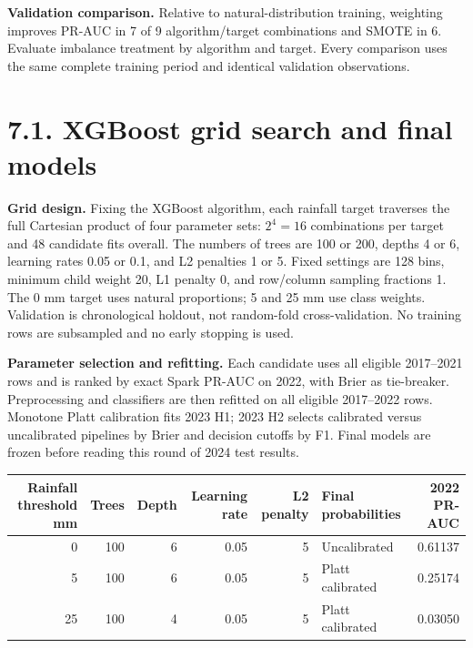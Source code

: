 \documentclass[UTF8,fontset=fandol,10pt,a4paper,landscape]{ctexart}
\begin{document}
\textbf{Validation comparison.} Relative to natural-distribution training, weighting improves PR-AUC in 7 of 9 algorithm/target combinations and SMOTE in 6. Evaluate imbalance treatment by algorithm and target. Every comparison uses the same complete training period and identical validation observations.

\clearpage\section*{7.1. XGBoost grid search and final models}

\textbf{Grid design.} Fixing the XGBoost algorithm, each rainfall target traverses the full Cartesian product of four parameter sets: $2^4=16$ combinations per target and 48 candidate fits overall. The numbers of trees are 100 or 200, depths 4 or 6, learning rates 0.05 or 0.1, and L2 penalties 1 or 5. Fixed settings are 128 bins, minimum child weight 20, L1 penalty 0, and row/column sampling fractions 1. The 0 mm target uses natural proportions; 5 and 25 mm use class weights. Validation is chronological holdout, not random-fold cross-validation. No training rows are subsampled and no early stopping is used.

\textbf{Parameter selection and refitting.} Each candidate uses all eligible 2017--2021 rows and is ranked by exact Spark PR-AUC on 2022, with Brier as tie-breaker. Preprocessing and classifiers are then refitted on all eligible 2017--2022 rows. Monotone Platt calibration fits 2023 H1; 2023 H2 selects calibrated versus uncalibrated pipelines by Brier and decision cutoffs by F1. Final models are frozen before reading this round of 2024 test results.
\begin{center}\begin{tabular}{rrrrrlr}\toprule
Rainfall threshold mm & Trees & Depth & Learning rate & L2 penalty & Final probabilities & 2022 PR-AUC\\\midrule
0 & 100 & 6 & 0.05 & 5 & Uncalibrated & 0.61137\\
5 & 100 & 6 & 0.05 & 5 & Platt calibrated & 0.25174\\
25 & 100 & 4 & 0.05 & 5 & Platt calibrated & 0.03050\\
\bottomrule\end{tabular}\end{center}
\end{document}
